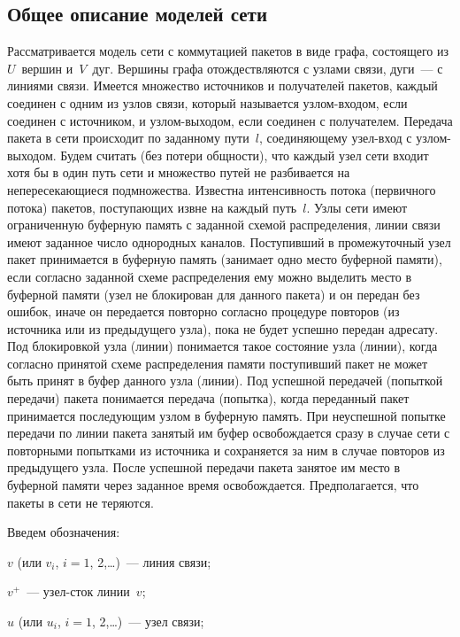 \begin{multicols}{2}
\section{Общее описание моделей сети}
     
     Рассматривается модель сети с коммутацией пакетов в виде графа, 
состоящего из $U$~вершин и~$V$~дуг. Вершины графа отождествляются с 
узлами связи, дуги~--- с линиями связи. Имеется множество источников и 
получателей пакетов, каждый соединен с одним из узлов связи, 
который называется узлом-входом, если соединен с источником, и 
узлом-выходом, если соединен с получателем. Передача пакета в сети происходит по 
заданному пути~$l$, соединяющему узел-вход с узлом-выходом. Будем считать 
(без потери общности), что каждый узел сети входит хотя бы в один путь сети и 
множество путей не разбивается на непересекающиеся подмножества. Известна 
интенсивность потока (первичного потока) пакетов, поступающих извне на 
каждый путь~$l$. Узлы сети имеют ограниченную буферную память с заданной 
схемой распределения, линии связи имеют заданное число однородных 
каналов. Поступивший в промежуточный узел пакет принимается в буферную 
память (занимает одно место буферной памяти), если согласно заданной схеме 
распределения ему можно выделить место в буферной памяти (узел не 
блокирован для данного пакета) и он передан без ошибок, иначе он передается 
повторно согласно процедуре повторов (из источника или из предыдущего 
узла), пока не будет успешно передан адресату. Под блокировкой узла (линии) 
понимается такое состояние узла (линии), когда согласно принятой схеме 
распределения памяти поступивший пакет не может быть принят в буфер 
данного узла (линии). Под успешной передачей (попыткой передачи) пакета 
понимается передача (попытка), когда переданный пакет принимается 
последующим узлом в буферную память. При неуспешной попытке передачи 
по линии пакета занятый им буфер освобождается сразу в случае сети с 
повторными попытками из источника и сохраняется за ним в случае повторов 
из предыдущего узла. После успешной передачи пакета занятое им место в 
буферной памяти через заданное время освобождается. Предполагается, что 
пакеты в сети не теряются.


     
     Введем обозначения:
     
     $v$ (или $v_i$, $i = 1$, 2,\ldots)~--- линия связи;
     
     
     $v^+$~--- узел-сток линии~$v$;
     
     $u$ (или $u_i$, $i = 1$, 2,\ldots)~--- узел связи;
     

\end{multicols}
